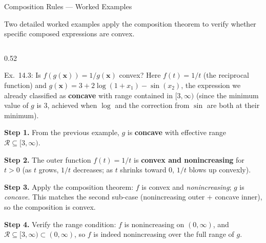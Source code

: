 \documentclass[aspectratio=169,10pt]{beamer}
\begin{document}
\begin{frame}[allowframebreaks]{Composition Rules --- Worked Examples}

  Two detailed worked examples apply the composition theorem to verify
  whether specific composed expressions are convex.

  \begin{columns}
    \begin{column}{0.52\textwidth}
      \begin{exampleblock}{Ex.\ 14.3: Is $f(g(\mathbf{x})) = 1/g(\mathbf{x})$ convex?}
        Here $f(t) = 1/t$ (the reciprocal function) and
        $g(\mathbf{x}) = 3 + 2\log(1+x_1) - \sin(x_2)$, the
        expression we already classified as \textbf{concave} with range
        contained in $[3, \infty)$ (since the minimum value of $g$ is
        $3$, achieved when $\log$ and the correction from $\sin$ are
        both at their minimum).

        \medskip
        \textbf{Step 1.}  From the previous example, $g$ is
        \textbf{concave} with effective range $\mathcal{R} \subseteq
        [3,\infty)$.

        \medskip
        \textbf{Step 2.}  The outer function $f(t) = 1/t$ is
        \textbf{convex and nonincreasing} for $t > 0$ (as $t$ grows,
        $1/t$ decreases; as $t$ shrinks toward 0, $1/t$ blows up
        convexly).

        \medskip
        \textbf{Step 3.}  Apply the composition theorem: $f$ is
        convex and \emph{nonincreasing}; $g$ is \emph{concave}.  This
        matches the second sub-case (nonincreasing outer + concave
        inner), so the composition is convex.

        \medskip
        \textbf{Step 4.}  Verify the range condition: $f$ is
        nonincreasing on $(0, \infty)$, and $\mathcal{R} \subseteq
        [3,\infty) \subset (0,\infty)$, so $f$ is indeed nonincreasing
        over the full range of $g$.


\end{exampleblock}
\end{column}
\end{columns}
\end{frame}
\end{document}

